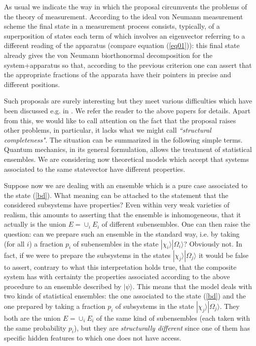 \documentclass[12pt]{article}
\begin{document}
As usual we indicate the way in which the proposal circumvents the
problems of the theory of measurement. According to the ideal von
Neumann measurement scheme the final state in a measurement
process consists, typically, of a superposition of states each
term of which involves an eigenvector referring to a different
reading of the apparatus (compare equation (\ref{eq01})): this
final state already gives the von Neumann biorthonormal
decomposition for the system+apparatus so that, according to the
previous criterion one can assert that the appropriate fractions
of the apparata have their pointers in precise and different
positions.

Such proposals are surely interesting but they meet various
difficulties which have been discussed e.g. in
\cite{blm,al2,sq1,alo1}. We refer the reader to the above papers
for details. Apart from this, we would like to call attention on
the fact that the proposal raises other problems, in particular,
it lacks what we might call {\it ``structural completeness"}. The
situation can be summarized in the following simple terms. Quantum
mechanics, in its general formulation, allows the treatment of
statistical ensembles. We are considering now theoretical models
which accept that systems associated to the same statevector have
different properties.

Suppose now we are dealing with an ensemble which is a pure case
associated to the state (\ref{bd}). What meaning can be attached
to the statement that the considered subsystems have properties?
Even within very weak varieties of realism, this amounts to
asserting that the ensemble is inhomogeneous, that it actually is
the union $E = \cup_{i} E_{i}$ of different subensembles. One can
then raise the question: can we prepare such an ensemble in the
standard way, i.e. by taking (for all $i$) a fraction $p_{i}$ of
subensembles in the state $|\chi_{i}\rangle |\Omega_{i}\rangle$?
Obviously not. In fact, if we were to prepare the subsystems in
the states $|\chi_{j}\rangle |\Omega_{j}\rangle$ it would be false
to assert, contrary to what this interpretation holds true, that
the composite system has with certainty the properties associated
according to the above procedure to an ensemble described by
$|\psi\rangle$. This means that the model deals with two kinds of
statistical ensembles: the one associated to the state (\ref{bd})
and the one prepared by taking a fraction $p_{i}$ of subsystems in
the state $|\chi_{j}\rangle |\Omega_{j}\rangle$. They both are the
union $E = \cup_{i} E_{i}$ of the same kind of subensembles (each
taken with the same probability $p_{i}$), but they are {\it
structurally different} since one of them has specific hidden
features to which one does not have access.
\end{document}
